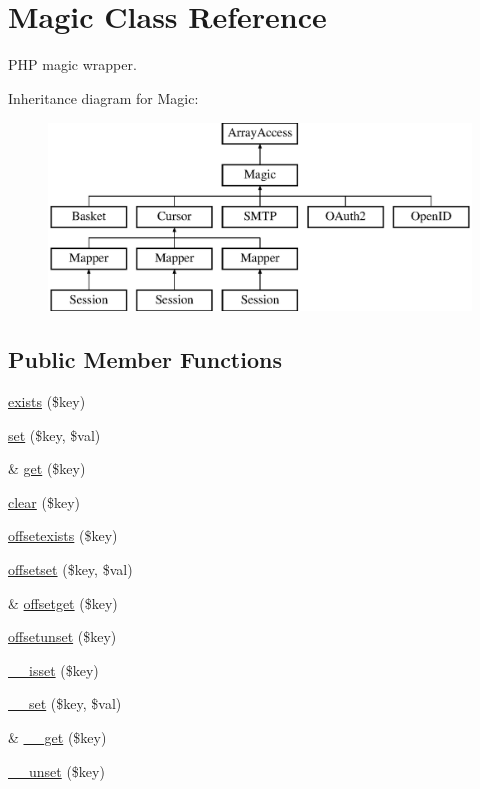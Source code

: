 \hypertarget{class_magic}{}\section{Magic Class Reference}
\label{class_magic}


P\+HP magic wrapper.  


Inheritance diagram for Magic\+:\begin{figure}[H]
\begin{center}
\leavevmode
\includegraphics[height=5.000000cm]{class_magic}
\end{center}
\end{figure}
\subsection*{Public Member Functions}
\begin{DoxyCompactItemize}
\item 
\hyperlink{class_magic_ace1ae5be37bf26c172cc7ea4e1a65e26}{exists} (\$key)
\item 
\hyperlink{class_magic_ac8d8012023e560c81f55a629022cb65a}{set} (\$key, \$val)
\item 
\& \hyperlink{class_magic_ac3695923790b06917410e205068b8376}{get} (\$key)
\item 
\hyperlink{class_magic_a10a949ef75de6c82c98ac555f371ba83}{clear} (\$key)
\item 
\hyperlink{class_magic_a16da5af940f99a0df550a7f7c7c5d4e4}{offsetexists} (\$key)
\item 
\hyperlink{class_magic_a67693a9cff0abdfbbd353c36c00fb8d3}{offsetset} (\$key, \$val)
\item 
\& \hyperlink{class_magic_a4736f7355697c49bcd06b643b4077e8a}{offsetget} (\$key)
\item 
\hyperlink{class_magic_a414cd1cb3c09fc06e5e83502f6309dde}{offsetunset} (\$key)
\item 
\hyperlink{class_magic_ae858fed7cd2822fbceac154138b68baa}{\+\_\+\+\_\+isset} (\$key)
\item 
\hyperlink{class_magic_ae5e0d9ea041c1957ef04189b0b29657c}{\+\_\+\+\_\+set} (\$key, \$val)
\item 
\& \hyperlink{class_magic_ae23a2c24bd42a7be642cdb71b58dbc5a}{\+\_\+\+\_\+get} (\$key)
\item 
\hyperlink{class_magic_a41af7dd29c879b4c30978876ebdf4ba7}{\+\_\+\+\_\+unset} (\$key)
\end{DoxyCompactItemize}


